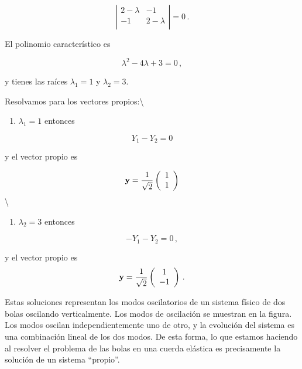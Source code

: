 \documentclass[
]{agujournal2019}
\providecommand{\tightlist}{%
  \setlength{\itemsep}{0pt}\setlength{\parskip}{0pt}}\usepackage{longtable,booktabs,array}
\begin{document}
\[\left|\begin{array}{cc}
  2-\lambda & -1 \\
   -1 & 2-\lambda\\
        \end{array}\right|=0\,.\]

El polinomio característico es

\[\lambda^2-4\lambda+3=0\,,\]

y tienes las raíces \(\lambda_1=1\) y \(\lambda_2=3\).

Resolvamos para los vectores propios:\textbackslash{}

\begin{enumerate}
\def\labelenumi{(\arabic{enumi})}
\tightlist
\item
  \(\lambda_1=1\) entonces
\end{enumerate}

\[Y_1-Y_2=0\]

y el vector propio es

\[{\textbf y}=\frac{1}{\sqrt{2}}\left(\begin{array}{c}
   1 \\
   1 \\
        \end{array}\right)\] \textbackslash{}

\begin{enumerate}
\def\labelenumi{(\arabic{enumi})}
\setcounter{enumi}{1}
\tightlist
\item
  \(\lambda_2=3\) entonces
\end{enumerate}

\[-Y_1-Y_2=0\,,\]

y el vector propio es
\[{\textbf y}=\frac{1}{\sqrt{2}}\left(\begin{array}{c}
   1 \\
   -1 \\
        \end{array}\right)\,.\]

Estas soluciones representan los modos oscilatorios de un sistema físico
de dos bolas oscilando verticalmente. Los modos de oscilación se
muestran en la figura. Los modos oscilan independientemente uno de otro,
y la evolución del sistema es una combinación lineal de los dos modos.
De esta forma, lo que estamos haciendo al resolver el problema de las
bolas en una cuerda elástica es precisamente la solución de un sistema
``propio''.

\vspace{0.5cm}
\begin{center}
\end{center}
\end{document}
